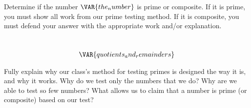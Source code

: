 
Determine if the number $\VAR{the_number}$ is prime or composite. If it is prime, you must show all work from our prime testing method. If it is composite, you must defend your answer with the appropriate work and/or explanation.\\

\begin{ansenv}
    \\
    \begin{align*}
        \VAR{quotients_and_remainders}
    \end{align*}
\end{ansenv}

\newpage


Fully explain why our class's method for testing primes is designed the way it is, and why it works. Why do we test only the numbers that we do? Why are we able to test so few numbers? What allows us to claim that a number is prime (or composite) based on our test?



